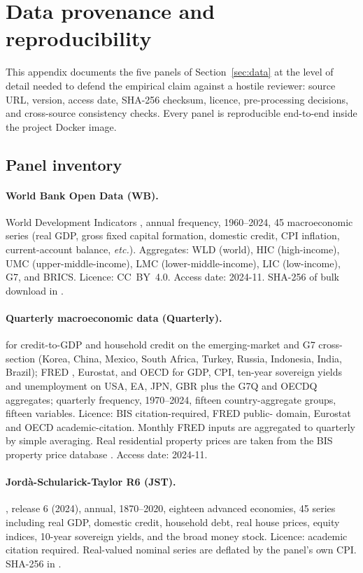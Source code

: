 \section{Data provenance and reproducibility}
\label{app:data}

This appendix documents the five panels of Section~\ref{sec:data} at
the level of detail needed to defend the empirical claim against a
hostile reviewer: source URL, version, access date, SHA-256
checksum, licence, pre-processing decisions, and cross-source
consistency checks. Every panel is reproducible end-to-end inside the
project Docker image.

\subsection{Panel inventory}

\paragraph{World Bank Open Data (WB).}
World Development Indicators \citep{wb_wdi}, annual frequency,
1960--2024, 45 macroeconomic series (real GDP, gross fixed capital
formation, domestic credit, CPI inflation, current-account balance,
\emph{etc.}). Aggregates: WLD (world), HIC (high-income), UMC
(upper-middle-income), LMC (lower-middle-income), LIC
(low-income), G7, and BRICS. Licence: CC~BY~4.0. Access date:
2024-11. SHA-256 of bulk download in
.

\paragraph{Quarterly macroeconomic data (Quarterly).}
\citet{bis_credit} for credit-to-GDP and household credit on the
emerging-market and G7 cross-section (Korea, China, Mexico, South
Africa, Turkey, Russia, Indonesia, India, Brazil); FRED \citep{fred},
Eurostat, and OECD for GDP, CPI, ten-year sovereign yields and
unemployment on USA, EA, JPN, GBR plus the G7Q and OECDQ aggregates;
quarterly frequency, 1970--2024, fifteen country-aggregate groups,
fifteen variables. Licence: BIS citation-required, FRED public-
domain, Eurostat and OECD academic-citation. Monthly FRED inputs
are aggregated to quarterly by simple averaging. Real residential
property prices are taken from the BIS property price database
\citep{bis_credit}. Access date: 2024-11.

\paragraph{Jord\`a-Schularick-Taylor R6 (JST).}
\citet{jorda_schularick_taylor2017}, release 6 (2024), annual,
1870--2020, eighteen advanced economies, 45 series including real
GDP, domestic credit, household debt, real house prices, equity
indices, 10-year sovereign yields, and the broad money stock.
Licence: academic citation required. Real-valued nominal series are
deflated by the panel's own CPI. SHA-256 in .

